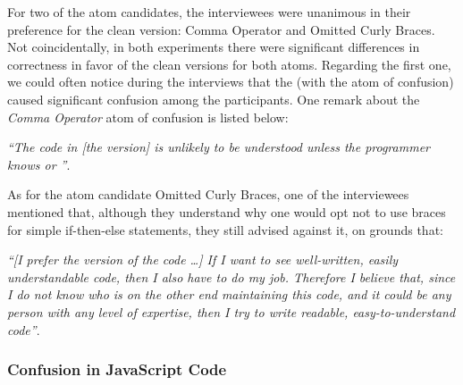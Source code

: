 For two of the atom candidates, the interviewees were unanimous in their preference for the clean version: Comma Operator and Omitted Curly Braces. Not coincidentally, in both experiments there were significant differences in correctness in favor of the clean versions for both atoms. Regarding the first one, we could often notice during the interviews that the \emph{\lhs} (with the atom of confusion) caused significant confusion among the participants. One remark about the \emph{Comma Operator} atom of confusion is listed below:


\begin{mq}
\emph{``The code in [the \lhs version] is unlikely to be understood unless the programmer knows \clang or \cpplang''}.
\end{mq}

As for the atom candidate Omitted Curly Braces, one of the interviewees mentioned that, although they understand why one would opt not to use braces for simple if-then-else statements, they still advised against it, on grounds that:

\begin{mq}
\emph{``[I prefer the \rhs version of the code \ldots]
If I want to see well-written, easily understandable code, then I also have to do my job. Therefore I believe that, since I do not know who is on the other end maintaining this code, and it could be any person with any level of expertise, then I try to write readable, easy-to-understand code''}.
\end{mq}





\subsubsection{Confusion in JavaScript Code} 

